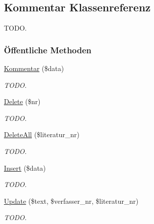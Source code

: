 \hypertarget{classKommentar}{
\subsection{Kommentar Klassenreferenz}
\label{classKommentar}
}
TODO.  


\subsubsection*{\"{O}ffentliche Methoden}
\begin{CompactItemize}
\item 
\hyperlink{classKommentar_ea774e2108c754890c602dfdd53d64e1}{Kommentar} (\$data)
\begin{CompactList}\small\item\em TODO. \item\end{CompactList}\item 
\hyperlink{classKommentar_31c1fdfb4fb8f24e0016c8ddb98ddcdc}{Delete} (\$nr)
\begin{CompactList}\small\item\em TODO. \item\end{CompactList}\item 
\hyperlink{classKommentar_9903f1df98f71eefa3b44a81d6a8ee5c}{Delete\-All} (\$literatur\_\-nr)
\begin{CompactList}\small\item\em TODO. \item\end{CompactList}\item 
\hyperlink{classKommentar_2cafefbbb7bddd9bc63ebe37bebcac1d}{Insert} (\$data)
\begin{CompactList}\small\item\em TODO. \item\end{CompactList}\item 
\hyperlink{classKommentar_074f62a61ba97457894fc52935724116}{Update} (\$text, \$verfasser\_\-nr, \$literatur\_\-nr)
\begin{CompactList}\small\item\em TODO. \item\end{CompactList}\end{CompactItemize}
